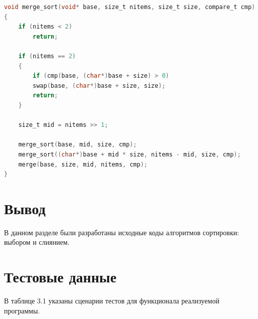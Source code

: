 \begin{lstlisting}[label=merge_sort,language=C,caption=Сортировка слиянием]
void merge_sort(void* base, size_t nitems, size_t size, compare_t cmp)
{
	if (nitems < 2)
		return;
	
	if (nitems == 2)
	{
		if (cmp(base, (char*)base + size) > 0)
		swap(base, (char*)base + size, size);
		return;
	}
	
	size_t mid = nitems >> 1;
	
	merge_sort(base, mid, size, cmp);
	merge_sort((char*)base + mid * size, nitems - mid, size, cmp);
	merge(base, size, mid, nitems, cmp);
}
\end{lstlisting}

\section{Вывод}

В данном разделе были разработаны исходные коды алгоритмов сортировки: выбором и слиянием.

\pagebreak

\section{Тестовые данные}

В таблице 3.1 указаны сценарии тестов для функционала реализуемой программы.

